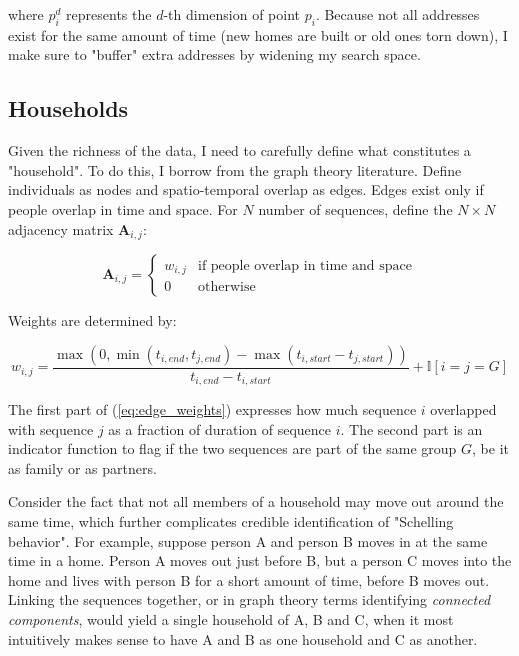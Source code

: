\documentclass[main.tex]{subfiles}
\begin{document}
where $p_i^d$ represents the $d$-th dimension of point $p_i$. Because not all addresses exist for the same amount of time (new homes are built or old ones torn down), I make sure to "buffer" extra addresses by widening my search space. 


\subsection{Households}
Given the richness of the data, I need to carefully define what constitutes a "household". To do this, I borrow from the graph theory literature. Define individuals as nodes and spatio-temporal overlap as edges. Edges exist only if people overlap in time and space. For $N$ number of sequences, define the $N \times N$ adjacency matrix $\mathbf{A}_{i,j}$:

\begin{equation}
    \mathbf{A}_{i,j} = \begin{cases}
        w_{i,j} & \text{if people overlap in time and space} \\
        0 & \text{otherwise}
    \end{cases}
\end{equation}

Weights are determined by:

\begin{equation}
    w_{i, j} = \frac{\max(0 , \min(t_{i,end}, t_{j, end}) -\max(t_{i,start}-t_{j, start}))}{t_{i,end}-t_{i,start}} + \mathbb{I}[i=j=G]
    \label{eq:edge_weights}
\end{equation}

The first part of (\ref{eq:edge_weights}) expresses how much sequence $i$ overlapped with sequence $j$ as a fraction of duration of sequence $i$. The second part is an indicator function to flag if the two sequences are part of the same group $G$, be it as family or as partners.

Consider the fact that not all members of a household may move out around the same time, which further complicates credible identification of "Schelling behavior". For example, suppose person A and person B moves in at the same time in a home. Person A moves out just before B, but a person C moves into the home and lives with person B for a short amount of time, before B moves out. Linking the sequences together, or in graph theory terms identifying \textit{connected components}, would yield a single household of A, B and C, when it most intuitively makes sense to have A and B as one household and C as another. 
\end{document}

